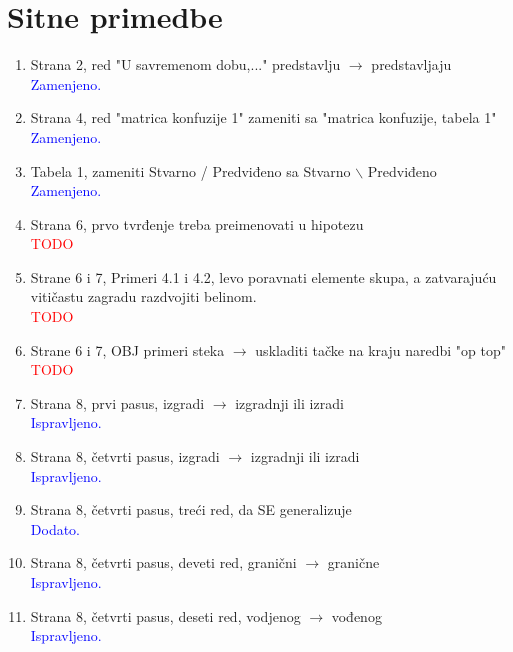 \documentclass[a4paper]{report}
\newcommand{\odgovor}[1]{\textcolor{blue}{#1}}
\newcommand{\todo}[1]{\textcolor{red}{#1}}
\begin{document}
\section{Sitne primedbe}

\begin{enumerate}
\item Strana 2, red "U savremenom dobu,..." predstavlju $\rightarrow$ predstavljaju
\\ \odgovor{Zamenjeno.}

\item Strana 4, red "matrica konfuzije 1" zameniti sa "matrica konfuzije, tabela 1"
\\ \odgovor{Zamenjeno.}

\item Tabela 1, zameniti Stvarno / Predviđeno sa Stvarno $\backslash$ Predviđeno
\\ \odgovor{Zamenjeno.}

\item Strana 6, prvo tvrđenje treba preimenovati u hipotezu
\\\todo{TODO}

\item Strane 6 i 7, Primeri 4.1 i 4.2, levo poravnati elemente skupa,
a zatvarajuću vitičastu zagradu razdvojiti belinom.
\\\todo{TODO}

\item Strane 6 i 7, OBJ primeri steka $\rightarrow$ uskladiti tačke na kraju naredbi "op top"
\\\todo{TODO}

\item Strana 8, prvi pasus, izgradi $\rightarrow$ izgradnji ili izradi
\\ \odgovor{Ispravljeno.}

\item Strana 8, četvrti pasus, izgradi $\rightarrow$ izgradnji ili izradi
\\ \odgovor{Ispravljeno.}

\item Strana 8, četvrti pasus, treći red, da SE generalizuje
\\ \odgovor{Dodato.}

\item Strana 8, četvrti pasus, deveti red, granični $\rightarrow$ granične
\\ \odgovor{Ispravljeno.}

\item Strana 8, četvrti pasus, deseti red, vodjenog $\rightarrow$ vođenog
\\ \odgovor{Ispravljeno.}


\end{enumerate}
\end{document}
